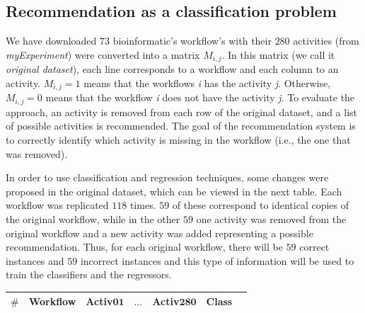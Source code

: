 \documentclass[a0, portrait]{a0poster}
\begin{document}
\begin{multicols}{2}
\subsection*{Recommendation as a classification problem}
We have downloaded $73$ bioinformatic's workflow's with their $280$ activities (from \emph{myExperiment}) were converted into a matrix $M_{i, j}$. In this matrix (we call it \emph{original dataset}), each line corresponds to a workflow and each column to an activity. $M_{i, j} = 1$ means that the workflows \emph{i} has the activity \emph{j}. Otherwise, $M_{i, j} = 0$ means that the workflow \emph{i} does not have the activity \emph{j}. To evaluate the approach, an activity is removed from each row of the original dataset, and a list of possible activities is recommended. The goal of the recommendation system is to correctly identify which activity is missing in the workflow (i.e., the one that was removed).

In order to use classification and regression techniques, some changes were proposed in the original dataset, which can be viewed in the next table. Each workflow was replicated \(118\) times. \(59\) of these correspond to identical copies of the original workflow, while in the other \(59\) one activity was removed from the original workflow and a new activity was added representing a possible recommendation. Thus, for each original workflow, there will be \(59\) correct instances and \(59\) incorrect instances and this type of information will be used to train the classifiers and the regressors. 
{ 
\color{darkgreen}
\vspace{0.25cm}
\begin{center}
\vspace{0.25cm}
\begin{tabular}{|l|l|l|l|l|l|l|}  \hline
\textbf{\(\#\)} & \textbf{Workflow} & \textbf{Activ\(\mathbf{01}\)} &  
\textbf{\(\mathbf{\ldots}\)}  & \textbf{Activ\(\mathbf{280}\)} &\textbf{Class} 				\\ \hline


\end{tabular}
\end{center}}
\end{multicols}
\end{document}
